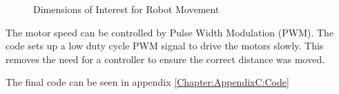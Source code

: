 \begin{figure}
\centering
{}
\caption{Dimensions of Interest for Robot Movement}
\label{fig:RobotBase_Annotated}
\end{figure}


The motor speed can be controlled by Pulse Width Modulation (PWM). The code sets up a low duty cycle PWM signal to drive the motors slowly. This removes the need for a controller to ensure the correct distance was moved. 

The final code can be seen in appendix \ref{Chapter:AppendixC:Code}
